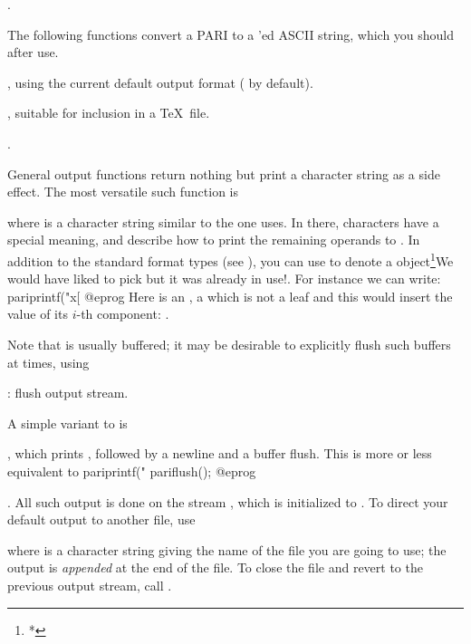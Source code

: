 .

The following functions convert a PARI  to a 'ed ASCII
string, which you should  after use.

, using the current default output format
( by default).

, suitable for inclusion in a \TeX\ file.

.

General output functions return nothing but print a character string as a
side effect. The most versatile such function is


\noindent where  is a character string similar to the one
 uses. In there, \kbd{\%} characters have a special meaning, and
describe how to print the remaining operands to
. In addition to the standard format types (see ), you can use
 to denote a  object\footnote{*}{We would have liked to
pick  but it was already in use!}. For instance we can write:
\bprog
    pariprintf("x[%
@eprog\noindent
Here  is an ,  a  which is not a leaf and
this would insert the value of its $i$-th  component: .

Note that  is usually buffered; it may be desirable to explicitly
flush such buffers at times, using

: flush output stream.

\noindent A simple variant to  is

, which prints , followed by a newline and a
buffer flush. This is more or less equivalent to
\bprog
    pariprintf("%
    pariflush();
@eprog

. All such output is done on the stream ,
which is initialized to . To direct your default output to
another file, use

 where  is a character string
giving the name of the file you are going to use; the output is
\emph{appended} at the end of the file. To close the file and revert to the
previous output stream, call .

